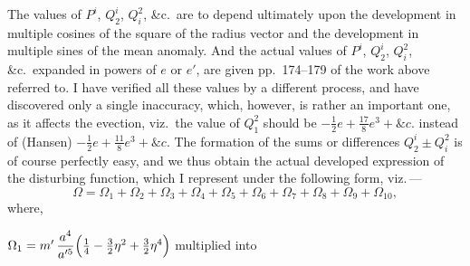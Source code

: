 \documentclass[11pt]{article}
\begin{document}
\medskip
\noindent The values of $P^{i}$, $Q_{2}^{i}$, $Q_{i}^{2}$, \&c.\ are to depend ultimately upon the development in multiple cosines of the square of the radius vector and the development in multiple sines of the mean anomaly. And the actual values of $P^{i}$, $Q_{2}^{i}$, $Q_{i}^{2}$, \&c.\ expanded in powers of $e$ or $e'$, are given pp.~174--179 of the work above referred to. I have verified all these values by a different process, and have discovered only a single inaccuracy, which, however, is rather an important one, as it affects the evection, viz.\ the value of $Q_{1}^{2}$ should be $-\tfrac{1}{2}e + \tfrac{17}{8}e^{3} + \&c.$ instead of (Hansen) $-\tfrac{1}{2}e + \tfrac{11}{8}e^{3} + \&c.$ The formation of the sums or differences $Q_{2}^{i}\pm Q_{i}^{2}$ is of course perfectly easy, and we thus obtain the actual developed expression of the disturbing function, which I represent under the following form, viz.\,---
\[
\Omega = \Omega_{1} + \Omega_{2} + \Omega_{3} + \Omega_{4} + \Omega_{5} + \Omega_{6} + \Omega_{7} + \Omega_{8} + \Omega_{9} + \Omega_{10},
\]
where,

\bigskip
{} $\Omega_{1} = m'\,\dfrac{a^{4}}{a'^{5}}\Bigl(\tfrac{1}{4}-\tfrac{3}{2}\eta^{2}+\tfrac{3}{2}\eta^{4}\Bigr)$ multiplied into
\end{document}
